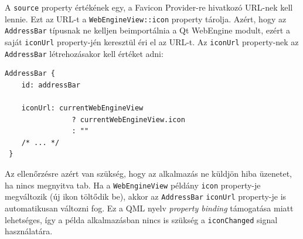 \documentclass[12pt]{report}
\begin{document}
A \texttt{source} property értékének egy, a Favicon Provider-re hivatkozó URL-nek kell lennie.
Ezt az URL-t a \texttt{WebEngineView::icon} property tárolja. Azért, hogy az
\texttt{AddressBar} típusnak ne kelljen beimportálnia a Qt WebEngine modult, ezért a saját
\texttt{iconUrl} property-jén keresztül éri el az URL-t. Az \texttt{iconUrl} property-nek az
\texttt{AddressBar} létrehozásakor kell értéket adni:
\begin{lstlisting}[title=main.qml]
 AddressBar {
    id: addressBar

    iconUrl: currentWebEngineView
                ? currentWebEngineView.icon
                : ""
    /* ... */
 }
\end{lstlisting}
Az ellenőrzésre azért van szükség, hogy az alkalmazás ne küldjön hiba üzenetet, ha nincs
megnyitva tab. Ha a \texttt{WebEngineView} példány \texttt{icon} property-je megváltozik
(új ikon töltődik be), akkor az \texttt{AddressBar} \texttt{iconUrl} property-je is
automatikusan változni fog. Ez a QML nyelv \textit{property binding} támogatása miatt
lehetséges, így a példa alkalmazásban nincs is szükség a \texttt{iconChanged} signal
használatára.
\end{document}
